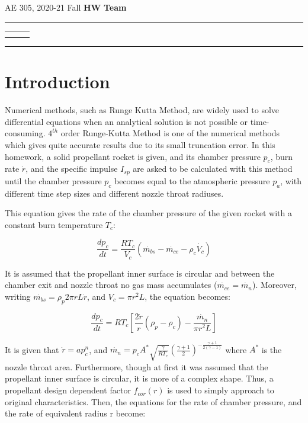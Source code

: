 \documentclass[letterpaper,12pt]{article}
\begin{document}
\begin{center}
AE 305, 2020-21 Fall \hfill \textbf{HW \HWno} \hfill \textbf{Team \TeamNo} \\
\noindent\rule{\textwidth}{0.4pt}
\begin{tabular}{p{} | p{} | p{} }
	\AuthorOneName&\AuthorTwoName&\AuthorThreeName\\
	\textit{\AuthorOneID}&\textit{\AuthorTwoID}&\textit{\AuthorThreeID}
\end{tabular}
\noindent\rule{\textwidth}{0.4pt}
\end{center}


\section{Introduction}

Numerical methods, such as Runge Kutta Method, are widely used to solve differential equations when an
analytical solution is not possible or time-consuming. $4^{th}$ order Runge-Kutta Method is one of the
numerical methods which gives quite accurate results due to its small truncation error. In this homework,
a solid propellant rocket is given, and its chamber pressure $p_c$, burn rate $\dot{r}$, and the specific
impulse $I_{sp}$ are asked to be calculated with this method until the chamber pressure $p_c$ becomes equal 
to the atmospheric pressure $p_a$, with different time step sizes and different nozzle throat radiuses.

This equation gives the rate of the chamber pressure of the given rocket with a constant burn temperature
$T_c$:

\begin{equation}
	\frac{dp_c}{dt} = \frac{RT_c}{V_c}(\dot{m_{bs}} - \dot{m_{ce}} - \rho_{c}\dot{V_c})
\end{equation}

It is assumed that the propellant inner surface is circular and between the chamber exit and nozzle throat
no gas mass accumulates ($\dot{m_{ce}} = \dot{m_n}$). Moreover, writing $\dot{m_{bs}} = \rho_{p}2\pi rL\dot{r}$,
and $V_c = \pi r^{2}L$, the equation becomes:

\begin{equation}
	\frac{dp_c}{dt} = RT_c[\frac{2\dot{r}}{r}(\rho_{p} - \rho_{c}) - \frac{\dot{m_n}}{\pi r^{2}L}]
\end{equation}

It is given that $\dot{r} = ap_c^{n}$, and $\dot{m_n} = p_cA^{*}\sqrt{\frac{\gamma}{RT_c}}(\frac{\gamma +1}{2})^{-\frac{\gamma +1}{2(\gamma -1)}}$
where $A^{*}$ is the nozzle throat area. Furthermore, though at first it was assumed that the propellant 
inner surface is circular, it is more of a complex shape. Thus, a propellant design dependent factor
$f_{cor}(r)$ is used to simply approach to original characteristics. Then, the equations for the rate
of chamber pressure, and the rate of equivalent radius r become:
\end{document}
